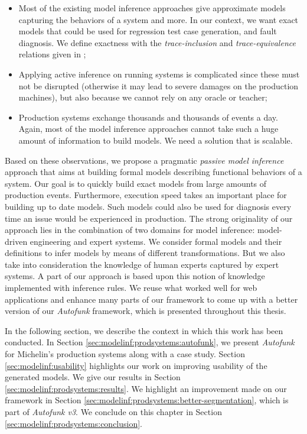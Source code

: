 \begin{itemize}
    \item Most of the existing model inference approaches give
        approximate models capturing the behaviors of a system
        and more. In our context, we want exact models that could
        be used for regression test case generation, and fault
        diagnosis. We define exactness with the
        \emph{trace-inclusion} and \emph{trace-equivalence}
        relations given in \cite{petrenko06};

    \item Applying active inference on running systems is
        complicated since these must not be disrupted (otherwise
        it may lead to severe damages on the production
        machines), but also because we cannot rely on any oracle
        or teacher;

    \item Production systems exchange thousands and thousands of
        events a day. Again, most of the model inference
        approaches cannot take such a huge amount of information
        to build models. We need a solution that is scalable.
\end{itemize}

Based on these observations, we propose a pragmatic \emph{passive
model inference} approach that aims at building formal models
describing functional behaviors of a system. Our goal is to
quickly build exact models from large amounts of production
events.  Furthermore, execution speed takes an important place
for building up to date models. Such models could also be used
for diagnosis every time an issue would be experienced in
production.  The strong originality of our approach lies in the
combination of two domains for model inference: model-driven
engineering and expert systems. We consider formal models and
their definitions to infer models by means of different
transformations. But we also take into consideration the
knowledge of human experts captured by expert systems. A part of
our approach is based upon this notion of knowledge implemented
with inference rules. We reuse what worked well for web
applications and enhance many parts of our framework to come up
with a better version of our \textit{Autofunk} framework, which
is presented throughout this thesis.

In the following section, we describe the context in which this
work has been conducted. In Section
\ref{sec:modelinf:prodsystems:autofunk}, we present
\textit{Autofunk} for Michelin's production systems along with a
case study. Section \ref{sec:modelinf:usability} highlights our
work on improving usability of the generated models.  We give our
results in Section \ref{sec:modelinf:prodsystems:results}. We
highlight an improvement made on our framework in Section
\ref{sec:modelinf:prodsystems:better-segmentation}, which is
part of \emph{Autofunk v3}. We conclude on this chapter in
Section \ref{sec:modelinf:prodsystems:conclusion}.

